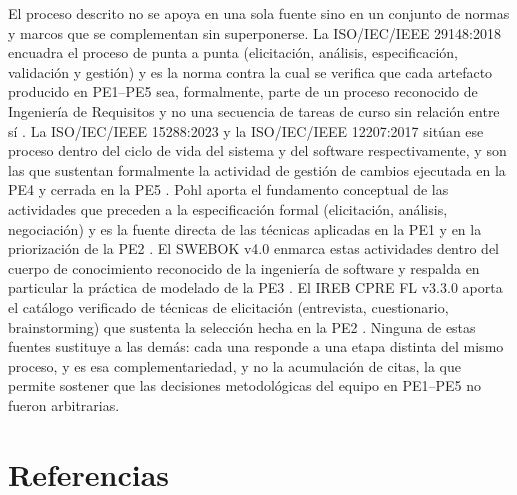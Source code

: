\documentclass[journal,onecolumn]{IEEEtran}
\begin{document}
El proceso descrito no se apoya en una sola fuente sino en un conjunto de normas y marcos
que se complementan sin superponerse. La ISO/IEC/IEEE 29148:2018 encuadra el proceso de punta a punta (elicitación, análisis, especificación, validación y gestión) y es la
norma contra la cual se verifica que cada artefacto producido en PE1--PE5 sea,
formalmente, parte de un proceso reconocido de Ingeniería de Requisitos y no una secuencia
de tareas de curso sin relación entre sí \cite{ieee29148}. La ISO/IEC/IEEE 15288:2023 y la
ISO/IEC/IEEE 12207:2017 sitúan ese proceso dentro del ciclo de vida del sistema y del
software respectivamente, y son las que sustentan formalmente la actividad de gestión de
cambios ejecutada en la PE4 y cerrada en la PE5 \cite{iso15288,iso12207}. Pohl aporta el
fundamento conceptual de las actividades que preceden a la especificación formal (elicitación, análisis, negociación) y es la fuente directa de las técnicas aplicadas en
la PE1 y en la priorización de la PE2 \cite{pohl2025}. El SWEBOK v4.0 enmarca estas
actividades dentro del cuerpo de conocimiento reconocido de la ingeniería de software y
respalda en particular la práctica de modelado de la PE3 \cite{swebok2024}. El IREB CPRE FL
v3.3.0 aporta el catálogo verificado de técnicas de elicitación (entrevista, cuestionario,
brainstorming) que sustenta la selección hecha en la PE2 \cite{ireb2026}. Ninguna de estas
fuentes sustituye a las demás: cada una responde a una etapa distinta del mismo proceso, y
es esa complementariedad, y no la acumulación de citas, la que permite sostener que las
decisiones metodológicas del equipo en PE1--PE5 no fueron arbitrarias.

\section{Referencias}

\printbibliography[heading=none]
\end{document}
